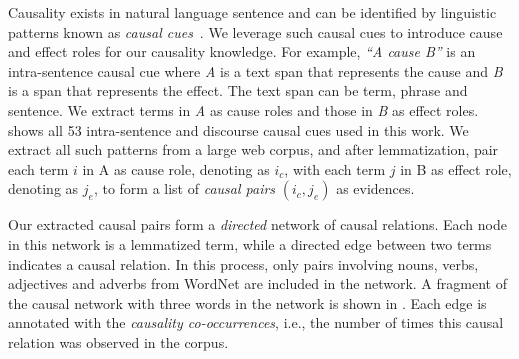 Causality exists in natural language sentence and can be identified by
linguistic patterns known as {\em causal cues}~\cite{ChangC04}.
We leverage such causal cues to introduce cause and effect roles for our
causality knowledge.
For example, \textit{``A cause B''} is an intra-sentence causal
cue where \textit{A} is a text span that represents the cause
and \textit{B} is a span that represents the effect.
The text span can be term, phrase and sentence.
We extract terms in \textit{A} as cause roles and those in \textit{B} as effect roles.
 shows all 53 intra-sentence and discourse
causal cues used in this work.
We extract all such patterns from a large web corpus, and after lemmatization,
pair each term $i$ in A as cause role, denoting as $i_c$, with each term $j$
in B as effect role, denoting as $j_e$, to form a list of 
\textit{causal pairs} $(i_c,j_e)$ as evidences.

Our extracted causal pairs form a {\em directed} network of causal relations. Each
node in this network is a lemmatized term, while a directed edge between two terms
indicates a causal relation.
In this process, only pairs involving nouns, verbs,
adjectives and adverbs from WordNet are included in the network.
A fragment of the causal network with three words in the network is
shown in .
Each edge is annotated with the {\em causality co-occurrences}, i.e.,
the number of times this causal relation was observed in the corpus.

